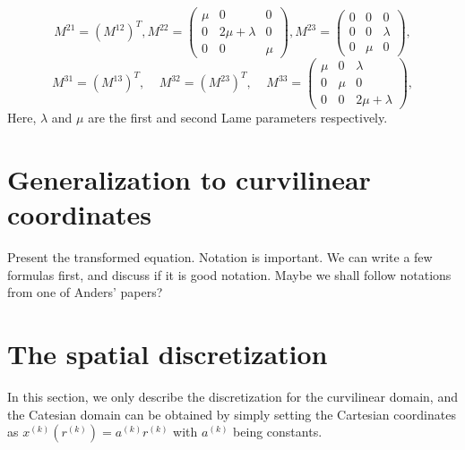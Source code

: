 \documentclass[a4paper]{article}
\begin{document}
\[ M^{21} =(M^{12})^T, M^{22} = \left(\begin{array}{ccc}
\mu & 0 & 0\\
0 & 2\mu+\lambda & 0\\
0 & 0 & \mu\end{array}\right), M^{23} = \left(\begin{array}{ccc}
0 & 0 & 0\\
0 & 0 & \lambda\\
0 & \mu & 0\end{array}\right),\]
\[ M^{31} = (M^{13})^T, \ \ \ \ \ M^{32} =(M^{23})^T, \ \ \ \ \ M^{33} = \left(\begin{array}{ccc}
\mu & 0 & \lambda\\
0 & \mu & 0\\
0 & 0 & 2\mu+\lambda\end{array}\right),\]
Here, $\lambda$ and $\mu$ are the first and second Lame parameters respectively.

\section{Generalization to curvilinear coordinates}
Present the transformed equation. Notation is important. We can write a few formulas first, and discuss if it is good notation. Maybe we shall follow notations from one of Anders' papers?

\section{The spatial discretization}

In this section, we only describe the discretization for the curvilinear domain, and the Catesian domain can be obtained by simply setting the Cartesian coordinates as $x^{(k)}(r^{(k)}) = a^{(k)}r^{(k)} $ with $a^{(k)}$ being constants.
\end{document}
